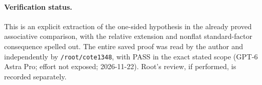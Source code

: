 \paragraph{Verification status.}
This is an explicit extraction of the one-sided hypothesis
in the already proved associative comparison, with the
relative extension and nonflat standard-factor consequence
spelled out. The entire saved proof was read by the author
and independently by \texttt{/root/cote1348}, with PASS
in the exact stated scope (GPT-6 Astra Pro; effort not
exposed; 2026-11-22). Root's review, if performed, is
recorded separately.
